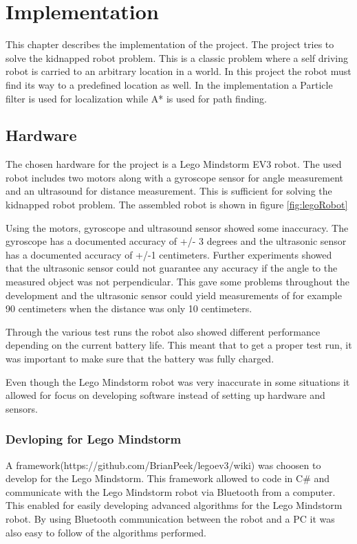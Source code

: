 \chapter{Implementation}
\label{chp:impl}

This chapter describes the implementation of the project. The project tries to solve the kidnapped robot problem. This is a classic problem where a self driving robot is carried to an arbitrary location in a world. In this project the robot must find its way to a predefined location as well. In the implementation a Particle filter is used for localization while A* is used for path finding.

\section{Hardware}
The chosen hardware for the project is a Lego Mindstorm EV3 robot. The used robot includes two motors along with a gyroscope sensor for angle measurement and an ultrasound for distance measurement. This is sufficient for solving the kidnapped robot problem. The assembled robot is shown in figure \ref{fig:legoRobot}

\FloatBarrier

Using the motors, gyroscope and ultrasound sensor showed some inaccuracy.  The gyroscope has a documented accuracy of +/- 3 degrees and the ultrasonic sensor has a documented accuracy of +/-1 centimeters. Further experiments showed that the ultrasonic sensor could not guarantee any accuracy if the angle to the measured object was not perpendicular. This gave some problems throughout the development and the ultrasonic sensor could yield measurements of for example 90 centimeters when the distance was only 10 centimeters. 

Through the various test runs the robot also showed different performance depending on the current battery life. This meant that to get a proper test run, it was important to make sure that the battery was fully charged. 

Even though the Lego Mindstorm robot was very inaccurate in some situations it allowed for focus on developing software instead of setting up hardware and sensors.

\subsection{Devloping for Lego Mindstorm}
A framework(https://github.com/BrianPeek/legoev3/wiki) was choosen to develop for the Lego Mindstorm. This framework allowed to code in C\# and communicate with the Lego Mindstorm robot via Bluetooth from a computer. This enabled for easily developing advanced algorithms for the Lego Mindstorm robot. By using Bluetooth communication between the robot and a PC it was also easy to follow of the algorithms performed.

